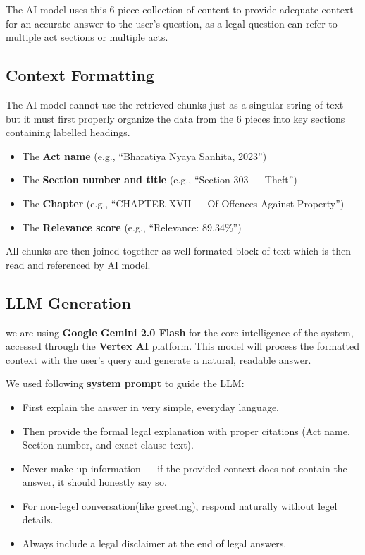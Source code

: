 \documentclass[12pt,a4paper]{article}
\begin{document}
The AI model uses this 6 piece collection of content to provide adequate context for an accurate answer to the user's question, as a legal question can refer to multiple act sections or multiple acts. 

\subsection{Context Formatting}

The AI model cannot use the retrieved chunks just as a singular string of text but it   must first properly organize the data from the 6 pieces into key sections containing labelled headings.
\begin{itemize}
  \item The \textbf{Act name} (e.g., ``Bharatiya Nyaya Sanhita, 2023'')
  \item The \textbf{Section number and title} (e.g., ``Section 303 --- Theft'')
  \item The \textbf{Chapter} (e.g., ``CHAPTER XVII --- Of Offences Against Property'')
  \item The \textbf{Relevance score} (e.g., ``Relevance: 89.34\%'')
\end{itemize}

All chunks are then joined together as well-formated block of text which is then read and referenced by AI model.
\subsection{LLM Generation}

we are using  \textbf{Google Gemini 2.0 Flash} for the core intelligence of the system, accessed through the \textbf{Vertex AI} platform. This model will process the formatted context with the user’s query and generate a natural, readable answer. 

We used following \textbf{system prompt} to guide the LLM: 
\begin{itemize}
  \item First explain the answer in very simple, everyday language.
  \item Then provide the formal legal explanation with proper citations (Act name, Section number, and exact clause text).
  \item Never make up information --- if the provided context does not contain the answer, it should honestly say so.
  \item For non-legel conversation(like greeting), respond naturally without legel details.
  \item Always include a legal disclaimer at the end of legal answers.
\end{itemize}
\end{document}
